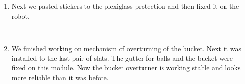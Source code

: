 \begin{enumerate}
\begin{enumerate}
		\item Next we pasted stickers to the plexiglass protection and then fixed it on the robot.
		\begin{figure}[H]
			\begin{minipage}[h]{0.2\linewidth}
				\center  
			\end{minipage}
			\begin{minipage}[h]{0.6\linewidth}
				\caption{}
			\end{minipage}
		\end{figure}
		
        \item We finished working on mechanism of overturning of the bucket. Next it was installed to the last pair of slats. The gutter for balls and the bucket were fixed on this module. Now the bucket overturner is working stable and looks more reliable than it was before.
        \begin{figure}[H]
        	\begin{minipage}[h]{0.2\linewidth}
        		\center  
        	\end{minipage}
        	\begin{minipage}[h]{0.6\linewidth}
        		\caption{}
        	\end{minipage}
        \end{figure}
        

\end{enumerate}
\end{enumerate}
